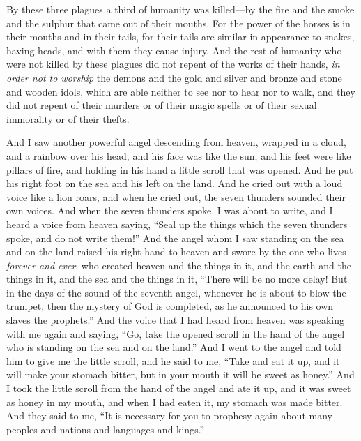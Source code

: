 \begin{biblechapter}
\verse By these three plagues a third of humanity was killed—by the fire and the smoke and the sulphur that came out of their mouths.
\verse For the power of the horses is in their mouths and in their tails, for their tails are similar in appearance to snakes, having heads, and with them they cause injury.
\verse And the rest of humanity who were not killed by these plagues did not repent of the works of their hands, \textit{in order not to worship} the demons and the gold and silver and bronze and stone and wooden idols, which are able neither to see nor to hear nor to walk,
\verse and they did not repent of their murders or of their magic spells or of their sexual immorality or of their thefts.
\end{biblechapter}

\begin{biblechapter} %
 And I saw another powerful angel descending from heaven, wrapped in a cloud, and a rainbow over his head, and his face was like the sun, and his feet were like pillars of fire,
\verse and holding in his hand a little scroll that was opened. And he put his right foot on the sea and his left on the land.
\verse And he cried out with a loud voice like a lion roars, and when he cried out, the seven thunders sounded their own voices.
\verse And when the seven thunders spoke, I was about to write, and I heard a voice from heaven saying, “Seal up the things which the seven thunders spoke, and do not write them!”
\verse And the angel whom I saw standing on the sea and on the land raised his right hand to heaven
\verse and swore by the one who lives \textit{forever and ever}, who created heaven and the things in it, and the earth and the things in it, and the sea and the things in it, “There will be no more delay!
\verse But in the days of the sound of the seventh angel, whenever he is about to blow the trumpet, then the mystery of God is completed, as he announced to his own slaves the prophets.”
\verse And the voice that I had heard from heaven was speaking with me again and saying, “Go, take the opened scroll in the hand of the angel who is standing on the sea and on the land.”
\verse And I went to the angel and told him to give me the little scroll, and he said to me, “Take and eat it up, and it will make your stomach bitter, but in your mouth it will be sweet as honey.”
\verse And I took the little scroll from the hand of the angel and ate it up, and it was sweet as honey in my mouth, and when I had eaten it, my stomach was made bitter.
\verse And they said to me, “It is necessary for you to prophesy again about many peoples and nations and languages and kings.”
\end{biblechapter}

